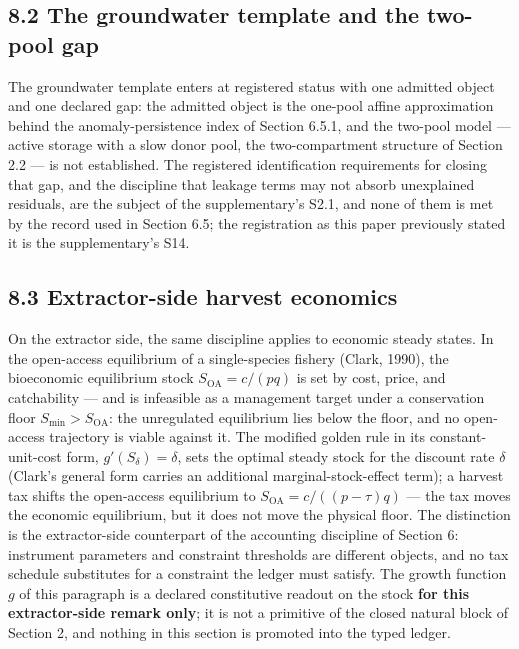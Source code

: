 \documentclass[11pt]{article}
\begin{document}
\subsection*{8.2 The groundwater template and the two-pool gap}\label{82-the-groundwater-template-and-the-two-pool-gap}

The groundwater template enters at registered status with one admitted object and one declared gap: the admitted object is the one-pool affine approximation behind the anomaly-persistence index of Section 6.5.1, and the two-pool model --- active storage with a slow donor pool, the two-compartment structure of Section 2.2 --- is not established. The registered identification requirements for closing that gap, and the discipline that leakage terms may not absorb unexplained residuals, are the subject of the supplementary's S2.1, and none of them is met by the record used in Section 6.5; the registration as this paper previously stated it is the supplementary's S14.

\subsection*{8.3 Extractor-side harvest economics}\label{83-extractor-side-harvest-economics}

On the extractor side, the same discipline applies to economic steady states. In the open-access equilibrium of a single-species fishery (Clark, 1990), the bioeconomic equilibrium stock \(S_{\mathrm{OA}} = c/(pq)\) is set by cost, price, and catchability --- and is infeasible as a management target under a conservation floor \(S_{\min} > S_{\mathrm{OA}}\): the unregulated equilibrium lies below the floor, and no open-access trajectory is viable against it. The modified golden rule in its constant-unit-cost form, \(g'(S_\delta) = \delta\), sets the optimal steady stock for the discount rate \(\delta\) (Clark's general form carries an additional marginal-stock-effect term); a harvest tax shifts the open-access equilibrium to \(S_{\mathrm{OA}} =\allowbreak{} c/((p - \tau)q)\) --- the tax moves the economic equilibrium, but it does not move the physical floor. The distinction is the extractor-side counterpart of the accounting discipline of Section 6: instrument parameters and constraint thresholds are different objects, and no tax schedule substitutes for a constraint the ledger must satisfy. The growth function \(g\) of this paragraph is a declared constitutive readout on the stock \textbf{for this extractor-side remark only}; it is not a primitive of the closed natural block of Section 2, and nothing in this section is promoted into the typed ledger.
\end{document}
